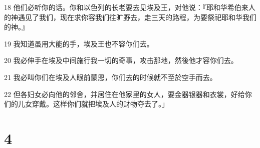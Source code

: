 \par 18 他们必听你的话。你和以色列的长老要去见埃及王，对他说：『耶和华希伯来人的神遇见了我们，现在求你容我们往旷野去，走三天的路程，为要祭祀耶和华我们的神。』
\par 19 我知道虽用大能的手，埃及王也不容你们去。
\par 20 我必伸手在埃及中间施行我一切的奇事，攻击那地，然後他才容你们去。
\par 21 我必叫你们在埃及人眼前蒙恩，你们去的时候就不至於空手而去。
\par 22 但各妇女必向他的邻舍，并居住在他家里的女人，要金器银器和衣裳，好给你们的儿女穿戴。这样你们就把埃及人的财物夺去了。」

\chapter{4}

